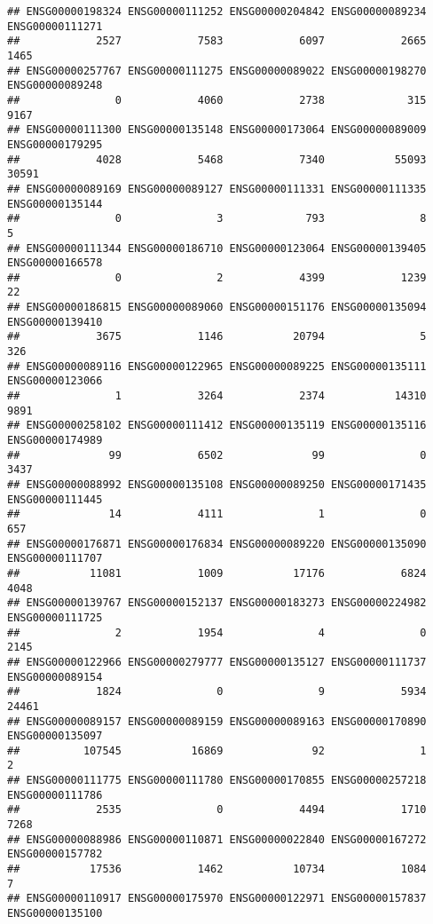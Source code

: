 \documentclass[
]{article}
\begin{document}
\begin{verbatim}
## ENSG00000198324 ENSG00000111252 ENSG00000204842 ENSG00000089234 ENSG00000111271 
##            2527            7583            6097            2665            1465 
## ENSG00000257767 ENSG00000111275 ENSG00000089022 ENSG00000198270 ENSG00000089248 
##               0            4060            2738             315            9167 
## ENSG00000111300 ENSG00000135148 ENSG00000173064 ENSG00000089009 ENSG00000179295 
##            4028            5468            7340           55093           30591 
## ENSG00000089169 ENSG00000089127 ENSG00000111331 ENSG00000111335 ENSG00000135144 
##               0               3             793               8               5 
## ENSG00000111344 ENSG00000186710 ENSG00000123064 ENSG00000139405 ENSG00000166578 
##               0               2            4399            1239              22 
## ENSG00000186815 ENSG00000089060 ENSG00000151176 ENSG00000135094 ENSG00000139410 
##            3675            1146           20794               5             326 
## ENSG00000089116 ENSG00000122965 ENSG00000089225 ENSG00000135111 ENSG00000123066 
##               1            3264            2374           14310            9891 
## ENSG00000258102 ENSG00000111412 ENSG00000135119 ENSG00000135116 ENSG00000174989 
##              99            6502              99               0            3437 
## ENSG00000088992 ENSG00000135108 ENSG00000089250 ENSG00000171435 ENSG00000111445 
##              14            4111               1               0             657 
## ENSG00000176871 ENSG00000176834 ENSG00000089220 ENSG00000135090 ENSG00000111707 
##           11081            1009           17176            6824            4048 
## ENSG00000139767 ENSG00000152137 ENSG00000183273 ENSG00000224982 ENSG00000111725 
##               2            1954               4               0            2145 
## ENSG00000122966 ENSG00000279777 ENSG00000135127 ENSG00000111737 ENSG00000089154 
##            1824               0               9            5934           24461 
## ENSG00000089157 ENSG00000089159 ENSG00000089163 ENSG00000170890 ENSG00000135097 
##          107545           16869              92               1               2 
## ENSG00000111775 ENSG00000111780 ENSG00000170855 ENSG00000257218 ENSG00000111786 
##            2535               0            4494            1710            7268 
## ENSG00000088986 ENSG00000110871 ENSG00000022840 ENSG00000167272 ENSG00000157782 
##           17536            1462           10734            1084               7 
## ENSG00000110917 ENSG00000175970 ENSG00000122971 ENSG00000157837 ENSG00000135100 

\end{verbatim}
\end{document}

